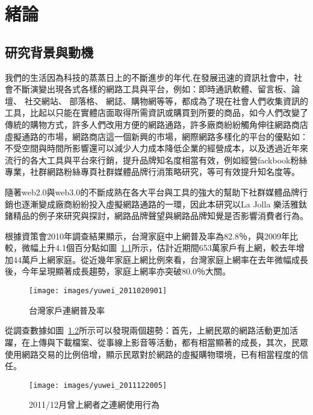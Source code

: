 \chapter{緒論}

\section{研究背景與動機}
我們的生活因為科技的蒸蒸日上的不斷進步的年代,在發展迅速的資訊社會中，社會不斷演變出現各式各樣的網路工具與平台，例如：即時通訊軟體、留言板、論壇、 社交網站、 部落格、 網誌、購物網等等，都成為了現在社會人們收集資訊的工具，比起以只能在實體店面取得所需資訊或購買到所要的商品，如今人們改變了傳統的購物方式，許多人們改用方便的網路通路，許多廠商紛紛觸角伸往網路商店虛擬通路的市場，網路商店這一個新興的市場，網際網路多樣化的平台的優點如：不受空間與時間所影響還可以減少人力成本降低企業的經營成本，以及透過近年來流行的各大工具與平台來行銷，提升品牌知名度相當有效，例如經營fackbook粉絲專業，社群網路粉絲專頁社群媒體品牌行消策略研究，等可有效提升知名度等。

隨著web2.0與web3.0的不斷成熟在各大平台與工具的強大的幫助下社群媒體品牌行銷也逐漸變成廠商紛紛投入虛擬網路通路的一環，因此本研究以La Jolla 樂活雅鈦鍺精品的例子來研究與探討，網路品牌聲望與網路品牌知覺是否影響消費者行為。

根據資策會2010年調查結果顯示\cite{資策會FIND}，台灣家庭中上網普及率為82.8％，與2009年比較，微幅上升4.1個百分點如圖~\ref{fig:yuwei_2011020901}所示，估計近期間653萬家戶有上網，較去年增加44萬戶上網家庭。從近幾年家庭上網比例來看，台灣家庭上網率在去年微幅成長後，今年呈現顯著成長趨勢，家庭上網率亦突破80.0％大關。

\begin{figure}[htbp]
\centering \texttt{[image: images/yuwei\_2011020901]}
\caption{\label{fig:yuwei_2011020901}台灣家戶連網普及率}
\end{figure}

從調查數據如圖~\ref{fig:yuwei_2011022005}所示可以發現兩個趨勢：首先，上網民眾的網路活動更加活躍，在上傳與下載檔案、從事線上影音等活動，都有相當顯著的成長，其次，民眾使用網路交易的比例倍增，顯示民眾對於網路的虛擬購物環境，已有相當程度的信任。\cite{資策會FIND}


\begin{figure}[htbp]
\centering \texttt{[image: images/yuwei\_2011122005]}
\caption{\label{fig:yuwei_2011022005}2011/12月曾上網者之連網使用行為}
\end{figure}

